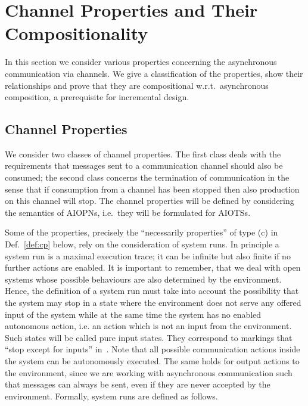 
\section{Channel Properties and Their Compositionality}\label{sec:communication}

In this section we consider various properties concerning the asynchronous communication via channels.
We give a classification of the properties, show their relationships and prove that they are compositional
w.r.t.\ asynchronous composition, a prerequisite for incremental design.

\subsection{Channel Properties}\label{sec:def-communication-prop}

We consider two classes of channel properties. The first class deals with the requirements that messages sent to a communication channel should also be consumed; the second class concerns the termination of communication in the sense that if consumption from a channel has been stopped then also production on this channel will stop. The channel properties will be defined by considering the semantics of AIOPNs, i.e.\ they will be formulated for AIOTSs.

Some of the properties, precisely the ``necessarily properties'' of type (c) in Def.~\ref{def:cp} below,
rely on the consideration of system runs.
In principle a system run is a maximal execution trace; it can be infinite but also finite if no further actions are enabled. It is important to remember, that we deal with open systems whose possible behaviours are also determined by the environment. Hence, the definition of a system run must take into account the possibility that the system may stop in a state where the environment does not serve any offered input of the system while at the same time the system has no enabled autonomous action, i.e. an action which is not an input from the environment. Such states will be called pure input states. 
They correspond to markings that ``stop except for inputs'' in~\cite{Stahl12}.
Note that all possible communication actions inside the system can be autonomously executed. The same holds for output actions to the environment, since we are working with asynchronous communication such that messages can always be sent, even if they are never accepted by the environment. Formally, system runs are defined as follows.

